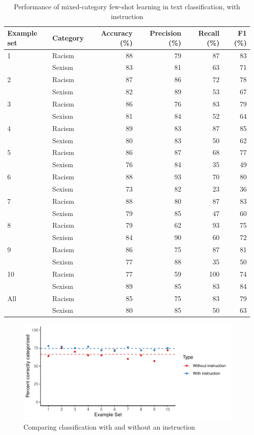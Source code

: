 \documentclass[12pt,]{article}
\begin{document}
\begin{table}

\caption{\label{tab:fewshotmixedinstruct-summary}Performance of mixed-category few-shot learning in text classification, with instruction}
\centering
\begin{tabular}[t]{llrrrr}
\toprule
Example set & Category & Accuracy (\%) & Precision (\%) & Recall (\%) & F1 (\%)\\
\midrule
1 & Racism & 88 & 79 & 87 & 83\\
 & Sexism & 83 & 81 & 63 & 71\\
\midrule
2 & Racism & 87 & 86 & 72 & 78\\
 & Sexism & 82 & 89 & 53 & 67\\
\midrule
3 & Racism & 86 & 76 & 83 & 79\\
 & Sexism & 81 & 84 & 52 & 64\\
\midrule
4 & Racism & 89 & 83 & 87 & 85\\
 & Sexism & 80 & 83 & 50 & 62\\
\midrule
5 & Racism & 86 & 87 & 68 & 77\\
 & Sexism & 76 & 84 & 35 & 49\\
\midrule
6 & Racism & 88 & 93 & 70 & 80\\
 & Sexism & 73 & 82 & 23 & 36\\
\midrule
7 & Racism & 88 & 80 & 87 & 83\\
 & Sexism & 79 & 85 & 47 & 60\\
\midrule
8 & Racism & 79 & 62 & 93 & 75\\
 & Sexism & 84 & 90 & 60 & 72\\
\midrule
9 & Racism & 86 & 75 & 87 & 81\\
 & Sexism & 77 & 88 & 35 & 50\\
\midrule
10 & Racism & 77 & 59 & 100 & 74\\
 & Sexism & 89 & 85 & 83 & 84\\
\midrule
All & Racism & 85 & 75 & 83 & 79\\
 & Sexism & 80 & 85 & 50 & 63\\
\bottomrule
\end{tabular}
\end{table}

\begin{figure}
\centering
\includegraphics{comparison-1.pdf}
\caption{\label{fig:comparison}Comparing classification with and without an instruction}
\end{figure}
\end{document}
